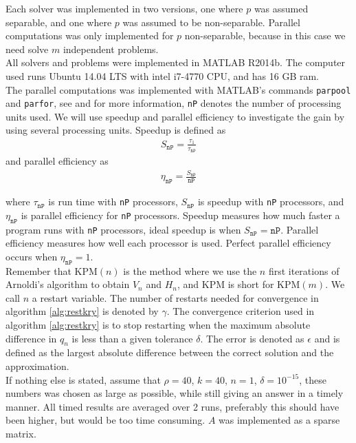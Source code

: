 Each solver was implemented in two versions, one where $p$ was assumed separable, and one where $p$ was assumed to be non-separable. Parallel computations was only implemented for $p$ non-separable, because in this case we need solve $m$ independent problems.\\%

All solvers and problems were implemented in MATLAB R2014b. The computer used runs Ubuntu 14.04 LTS with intel  i7-4770 CPU, and has 16 GB ram. \\

The parallel computations was implemented with MATLAB's commands \texttt{parpool} and \texttt{parfor}, see \cite{parpool} and \cite{parfor} for more information, \texttt{nP} denotes the number of processing units used. We will use speedup and parallel efficiency to investigate the gain by using several processing units. Speedup is defined as
\begin{align*}
S_\texttt{nP} = \frac{\tau_1}{\tau_\texttt{nP}}
\end{align*}
and parallel efficiency as
\begin{align*}
\eta_\texttt{nP} = \frac{S_\texttt{nP}}{\texttt{nP}}
\end{align*}

where $\tau_\texttt{nP}$ is run time with \texttt{nP} processors, $S_\texttt{nP}$ is speedup with \texttt{nP} processors, and $\eta_\texttt{nP}$ is parallel efficiency for \texttt{nP} processors. Speedup measures how much faster a program runs with \texttt{nP} processors, ideal speedup is when $S_\texttt{nP} = \texttt{nP}$. Parallel efficiency measures how well each processor is used. Perfect parallel efficiency occurs when $\eta_\texttt{nP} = 1$.\\

Remember that KPM$(n)$ is the method where we use the $n$ first iterations of Arnoldi's algorithm to obtain $V_n$ and $H_n$, and KPM is short for KPM$(m)$. We call $n$ a restart variable. The number of restarts needed for convergence in algorithm \ref{alg:restkry} is denoted by $\gamma$. The convergence criterion used in algorithm \ref{alg:restkry} is to stop restarting when the maximum absolute difference in $q_n$ is less than a given tolerance $\delta$. The error is denoted as $\epsilon$ and is defined as the largest absolute difference between the correct solution and the approximation. \\

If nothing else is stated, assume that $\rho =40$, $k = 40$, $n = 1$, $\delta = 10^{-15}$, these numbers was chosen as large as possible, while still giving an answer in a timely manner. All timed results are averaged over 2 runs, preferably this should have been higher, but would be too time consuming. $A$ was implemented as a sparse matrix.\\
 
